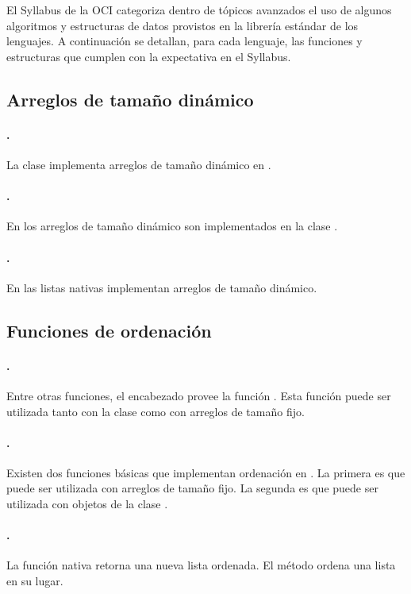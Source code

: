 El Syllabus de la OCI categoriza dentro de tópicos avanzados el uso de algunos
algoritmos y estructuras de datos provistos en la librería estándar de los
lenguajes.
A continuación se detallan, para cada lenguaje, las funciones y estructuras que
cumplen con la expectativa en el Syllabus.

\subsection{Arreglos de tamaño dinámico}
\label{tech-dynamic-array}
\paragraph{\cpp.} La clase  implementa arreglos de tamaño dinámico en
  \cpp.
\paragraph{\java.} En \java los arreglos de tamaño dinámico son implementados en la
  clase .
\paragraph{\python.} {\new En \python las listas nativas implementan arreglos de
  tamaño dinámico.}

\subsection{Funciones de ordenación}
\label{tech-sort-functions}
\paragraph{\cpp.} Entre otras funciones, el encabezado  provee la
  función .
  Esta función puede ser utilizada tanto con la clase  como con
  arreglos de tamaño fijo.
\paragraph{\java.} Existen dos funciones básicas que implementan ordenación en
  \java.
  La primera es  que puede ser utilizada con arreglos de
  tamaño fijo.
  La segunda es  que puede ser utilizada con objetos de
  la clase .
\paragraph{\python.} {\new La función nativa  retorna una nueva
  lista ordenada.
  El método  ordena una lista en su lugar.}
  
